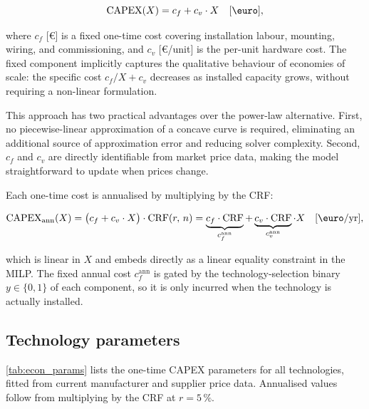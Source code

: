 \documentclass[11pt,a4paper]{report}
\begin{document}
\begin{equation}
    \mathrm{CAPEX}(X) = c_f + c_v \cdot X \quad [\text{\euro}],
    \label{eq:capex_affine}
\end{equation}

\noindent where $c_f$ [\euro] is a fixed one-time cost covering installation labour,
mounting, wiring, and commissioning, and $c_v$ [\euro/unit] is the per-unit hardware cost.
The fixed component implicitly captures the qualitative behaviour of economies of scale:
the specific cost $c_f/X + c_v$ decreases as installed capacity grows, without
requiring a non-linear formulation.

This approach has two practical advantages over the power-law alternative.
First, no piecewise-linear approximation of a concave curve is required, eliminating
an additional source of approximation error and reducing solver complexity.
Second, $c_f$ and $c_v$ are directly identifiable from market price data, making the
model straightforward to update when prices change.

Each one-time cost is annualised by multiplying by the CRF:

\begin{equation}
    \mathrm{CAPEX}_\mathrm{ann}(X)
    = \bigl(c_f + c_v \cdot X\bigr) \cdot \mathrm{CRF}(r,\,n)
    = \underbrace{c_f \cdot \mathrm{CRF}}_{c_f^\mathrm{ann}}
    + \underbrace{c_v \cdot \mathrm{CRF}}_{c_v^\mathrm{ann}} \cdot X
    \quad [\text{\euro/yr}],
    \label{eq:capex_ann_affine}
\end{equation}

\noindent which is linear in $X$ and embeds directly as a linear equality constraint
in the MILP.
The fixed annual cost $c_f^\mathrm{ann}$ is gated by the technology-selection binary
$y \in \{0,1\}$ of each component, so it is only incurred when the technology is
actually installed.

\subsection{Technology parameters}
\label{sub:tech_params}

\autoref{tab:econ_params} lists the one-time CAPEX parameters for all technologies,
fitted from current manufacturer and supplier price data.
Annualised values follow from multiplying by the CRF at $r = 5\,\%$.
\end{document}

